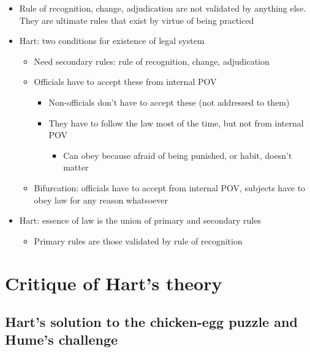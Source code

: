 \begin{itemize}
\tightlist
\item
  Rule of recognition, change, adjudication are not validated by
  anything else. They are ultimate rules that exist by virtue of being
  practiced
\item
  Hart: two conditions for existence of legal system

  \begin{itemize}
  \tightlist
  \item
    Need secondary rules: rule of recognition, change, adjudication
  \item
    Officials have to accept these from internal POV

    \begin{itemize}
    \tightlist
    \item
      Non-officials don't have to accept these (not addressed to them)
    \item
      They have to follow the law most of the time, but not from
      internal POV

      \begin{itemize}
      \tightlist
      \item
        Can obey because afraid of being punished, or habit, doesn't
        matter
      \end{itemize}
    \end{itemize}
  \item
    Bifurcation: officials have to accept from internal POV, subjects
    have to obey law for any reason whatsoever
  \end{itemize}
\item
  Hart: essence of law is the union of primary and secondary rules

  \begin{itemize}
  \tightlist
  \item
    Primary rules are those validated by rule of recognition
  \end{itemize}
\end{itemize}

\hypertarget{critique-of-harts-theory}{%
\section{Critique of Hart's theory}\label{critique-of-harts-theory}}

\hypertarget{harts-solution-to-the-chicken-egg-puzzle-and-humes-challenge}{%
\subsection{Hart's solution to the chicken-egg puzzle and Hume's
challenge}\label{harts-solution-to-the-chicken-egg-puzzle-and-humes-challenge}}

